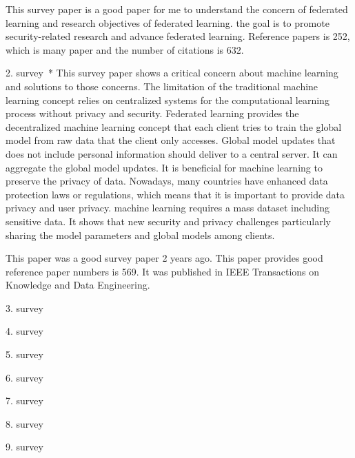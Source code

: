 \documentclass[manuscript,screen,review]{acmart}
\begin{document}
This survey paper is a good paper for me to understand the concern of federated learning and research objectives of federated learning. the goal is to promote security-related research and advance federated learning. Reference papers is 252, which is many paper and the number of citations is 632.

2. survey~\cite{li2021survey}*
This survey paper shows a critical concern about machine learning and solutions to those concerns. The limitation of the traditional machine learning concept relies on centralized systems for the computational learning process without privacy and security. Federated learning provides the decentralized machine learning concept that each client tries to train the global model from raw data that the client only accesses. Global model updates that does not include personal information should deliver to a central server. It can aggregate the global model updates. It is beneficial for machine learning to preserve the privacy of data. Nowadays, many countries have enhanced data protection laws or regulations, which means that it is important to provide data privacy and user privacy. machine learning requires a mass dataset including sensitive data. It shows that new security and privacy challenges particularly sharing the model parameters and global models among clients. 

This paper was a good survey paper 2 years ago. This paper provides good reference paper numbers is 
 569. It was published in IEEE Transactions on Knowledge and Data Engineering.     

3. survey~\cite{yin2021comprehensive}

4. survey~\cite{zhang2021survey}

5. survey~\cite{lyu2020threats}

6. survey~\cite{truong2021privacy}

7. survey~\cite{blanco2021achieving}

8. survey~\cite{liu2022privacy}

9. survey~\cite{rasha2023federated}
\end{document}
